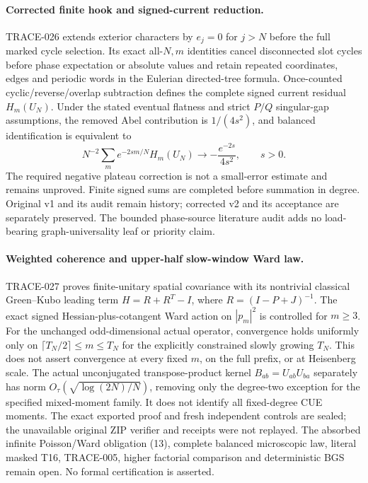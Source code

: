 \paragraph{Corrected finite hook and signed-current reduction.}
TRACE-026 extends exterior characters by $e_j=0$ for $j>N$ before the full
marked cycle selection. Its exact all-$N,m$ identities cancel disconnected
slot cycles before phase expectation or absolute values and retain repeated
coordinates, edges and periodic words in the Eulerian directed-tree formula.
Once-counted cyclic/reverse/overlap subtraction defines the complete signed
current residual $H_m(U_N)$. Under the stated eventual flatness and strict
$P/Q$ singular-gap assumptions, the removed Abel contribution is
$1/(4s^2)$, and balanced identification is equivalent to
\[
 N^{-2}\sum_m e^{-2sm/N}H_m(U_N)
 \longrightarrow -\frac{e^{-2s}}{4s^2},\qquad s>0.
\]
The required negative plateau correction is not a small-error estimate and
remains unproved. Finite signed sums are completed before summation in degree.
Original v1 and its audit remain history; corrected v2 and its acceptance
are separately preserved. The bounded phase-source literature audit adds no
load-bearing graph-universality leaf or priority claim.

\paragraph{Weighted coherence and upper-half slow-window Ward law.}
TRACE-027 proves finite-unitary spatial covariance with its nontrivial
classical Green--Kubo leading term $H=R+R^T-I$, where
$R=(I-P+J)^{-1}$. The exact signed Hessian-plus-cotangent Ward action on
$|p_m|^2$ is controlled for $m\ge3$. For the unchanged odd-dimensional
actual operator, convergence holds uniformly only on
$\lceil T_N/2\rceil\le m\le T_N$ for the explicitly constrained slowly
growing $T_N$. This does not assert convergence at every fixed $m$, on the
full prefix, or at Heisenberg scale. The actual unconjugated transpose-product
kernel $B_{ab}=U_{ab}U_{ba}$ separately has norm
$O_\tau(\sqrt{\log(2N)/N})$, removing only the degree-two exception for the
specified mixed-moment family. It does not identify all fixed-degree CUE
moments. The exact exported proof and fresh independent controls are sealed;
the unavailable original ZIP verifier and receipts were not replayed.
The absorbed infinite Poisson/Ward obligation (13), complete balanced
microscopic law, literal masked T16, TRACE-005, higher factorial comparison
and deterministic BGS remain open. No formal certification is asserted.
